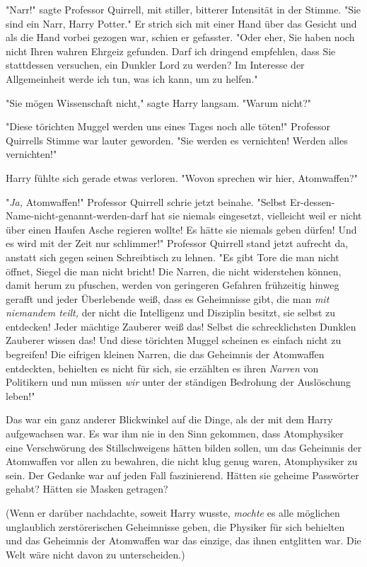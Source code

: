 {"Narr!" sagte Professor Quirrell, mit stiller, bitterer Intensität in der Stimme. "Sie sind ein Narr, Harry Potter." Er strich sich mit einer Hand über das Gesicht und als die Hand vorbei gezogen war, schien er gefasster. "Oder eher, Sie haben noch nicht Ihren wahren Ehrgeiz gefunden. Darf ich dringend empfehlen, dass Sie stattdessen versuchen, ein Dunkler Lord zu werden? Im Interesse der Allgemeinheit werde ich tun, was ich kann, um zu helfen."

"Sie mögen Wissenschaft nicht," sagte Harry langsam. "Warum nicht?"

"Diese törichten Muggel werden uns eines Tages noch alle töten!" Professor Quirrells Stimme war lauter geworden. "Sie werden es vernichten! Werden alles vernichten!"

Harry fühlte sich gerade etwas verloren. "Wovon sprechen wir hier, Atomwaffen?"

"\emph{Ja,} Atomwaffen!" Professor Quirrell schrie jetzt beinahe. "Selbst Er-dessen-Name-nicht-genannt-werden-darf hat sie niemals eingesetzt, vielleicht weil er nicht über einen Haufen Asche regieren wollte! Es hätte sie niemals geben dürfen! Und es wird mit der Zeit nur schlimmer!" Professor Quirrell stand jetzt aufrecht da, anstatt sich gegen seinen Schreibtisch zu lehnen. "Es gibt Tore die man nicht öffnet, Siegel die man nicht bricht! Die Narren, die nicht widerstehen können, damit herum zu pfuschen, werden von geringeren Gefahren frühzeitig hinweg gerafft und jeder Überlebende weiß, dass es Geheimnisse gibt, die man \emph{mit niemandem teilt,} der nicht die Intelligenz und Disziplin besitzt, sie selbst zu entdecken! Jeder mächtige Zauberer weiß das! Selbst die schrecklichsten Dunklen Zauberer wissen das! Und diese törichten Muggel scheinen es einfach nicht zu begreifen! Die eifrigen kleinen Narren, die das Geheimnis der Atomwaffen entdeckten, behielten es nicht für sich, sie erzählten es ihren \emph{Narren} von Politikern und nun müssen \emph{wir} unter der ständigen Bedrohung der Auslöschung leben!"

Das war ein ganz anderer Blickwinkel auf die Dinge, als der mit dem Harry aufgewachsen war. Es war ihm nie in den Sinn gekommen, dass Atomphysiker eine Verschwörung des Stillschweigens hätten bilden sollen, um das Geheimnis der Atomwaffen vor allen zu bewahren, die nicht klug genug waren, Atomphysiker zu sein. Der Gedanke war auf jeden Fall faszinierend. Hätten sie geheime Passwörter gehabt? Hätten sie Masken getragen?

(Wenn er darüber nachdachte, soweit Harry wusste, \emph{mochte} es alle möglichen unglaublich zerstörerischen Geheimnisse geben, die Physiker für sich behielten und das Geheimnis der Atomwaffen war das einzige, das ihnen entglitten war. Die Welt wäre nicht davon zu unterscheiden.)

}
